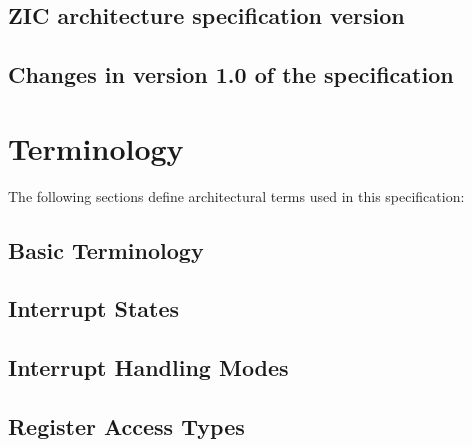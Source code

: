 \subsection{ZIC architecture specification version}

\subsection{Changes in version 1.0 of the specification}

\section{Terminology}
\label{sec:terminology}
The following sections define architectural terms used in this specification:

\subsection{Basic Terminology}

\subsection{Interrupt States}

\subsection{Interrupt Handling Modes}

\subsection{Register Access Types}
